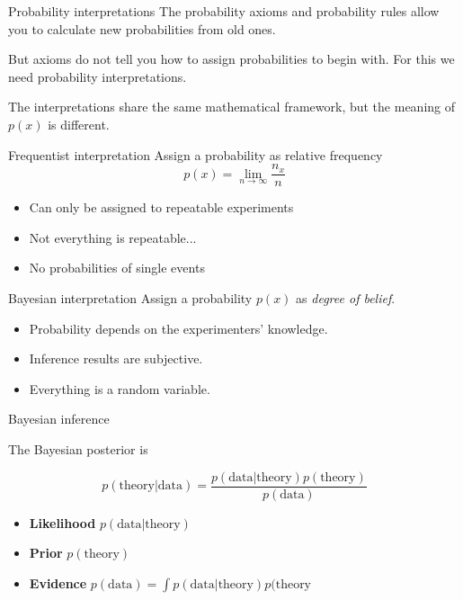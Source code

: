 \documentclass[
aspectratio=169,
14pt,
professionalfonts
]{beamer}
\begin{document}
\begin{frame}{Probability interpretations}
    The probability axioms and probability rules allow you to calculate new probabilities from old ones. 

    But axioms do not tell you how to assign probabilities to begin with. For this we need probability interpretations. 

    The interpretations share the same mathematical framework, but the meaning of $p(x)$ is different.
\end{frame}

\begin{frame}{Frequentist interpretation}
Assign a probability as relative frequency
$$
p(x) = \lim_{n\to\infty} \frac{n_x}{n}
$$ 

\begin{itemize}
    \item Can only be assigned to repeatable experiments
    \item Not everything is repeatable...
    \item No probabilities of single events
\end{itemize}
\end{frame}

\begin{frame}{Bayesian interpretation}
Assign a probability $p(x)$ as \textit{degree of belief}.

\begin{itemize}
    \item Probability depends on the experimenters' knowledge.
    \item Inference results are subjective.
    \item Everything is a random variable.
\end{itemize}
\end{frame}

\begin{frame}{Bayesian inference}

The Bayesian posterior is

$$p(\text{theory} | \text{data}) = \frac{p(\text{data}|\text{theory}) p(\text{theory})}{p(\text{data})}$$

\begin{itemize}
    \item \textbf{Likelihood} $p(\text{data}|\text{theory})$
    \item \textbf{Prior} $p(\text{theory})$
    \item \textbf{Evidence} $p(\text{data}) = \int p(\text{data}|\text{theory}) p(\text{theory}$
\end{itemize}
\end{frame}
\end{document}
